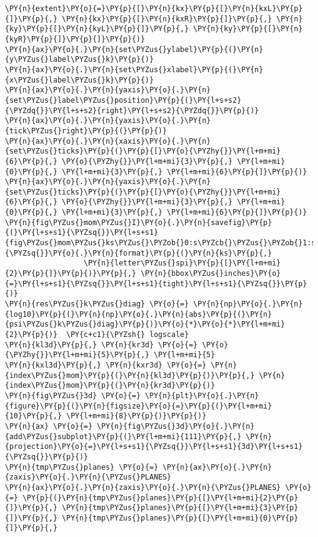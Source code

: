 \begin{Verbatim}[commandchars=\\\{\}]
          \PY{n}{extent}\PY{o}{=}\PY{p}{[}\PY{n}{kx}\PY{p}{[}\PY{n}{kxL}\PY{p}{]}\PY{p}{,} \PY{n}{kx}\PY{p}{[}\PY{n}{kxR}\PY{p}{]}\PY{p}{,} \PY{n}{ky}\PY{p}{[}\PY{n}{kyL}\PY{p}{]}\PY{p}{,} \PY{n}{ky}\PY{p}{[}\PY{n}{kyR}\PY{p}{]}\PY{p}{]}\PY{p}{)}
\PY{n}{ax}\PY{o}{.}\PY{n}{set\PYZus{}ylabel}\PY{p}{(}\PY{n}{y\PYZus{}label\PYZus{}k}\PY{p}{)}
\PY{n}{ax}\PY{o}{.}\PY{n}{set\PYZus{}xlabel}\PY{p}{(}\PY{n}{x\PYZus{}label\PYZus{}k}\PY{p}{)}
\PY{n}{ax}\PY{o}{.}\PY{n}{yaxis}\PY{o}{.}\PY{n}{set\PYZus{}label\PYZus{}position}\PY{p}{(}\PY{l+s+s2}{\PYZdq{}}\PY{l+s+s2}{right}\PY{l+s+s2}{\PYZdq{}}\PY{p}{)}
\PY{n}{ax}\PY{o}{.}\PY{n}{yaxis}\PY{o}{.}\PY{n}{tick\PYZus{}right}\PY{p}{(}\PY{p}{)}
\PY{n}{ax}\PY{o}{.}\PY{n}{xaxis}\PY{o}{.}\PY{n}{set\PYZus{}ticks}\PY{p}{(}\PY{p}{[}\PY{o}{\PYZhy{}}\PY{l+m+mi}{6}\PY{p}{,} \PY{o}{\PYZhy{}}\PY{l+m+mi}{3}\PY{p}{,} \PY{l+m+mi}{0}\PY{p}{,} \PY{l+m+mi}{3}\PY{p}{,} \PY{l+m+mi}{6}\PY{p}{]}\PY{p}{)}
\PY{n}{ax}\PY{o}{.}\PY{n}{yaxis}\PY{o}{.}\PY{n}{set\PYZus{}ticks}\PY{p}{(}\PY{p}{[}\PY{o}{\PYZhy{}}\PY{l+m+mi}{6}\PY{p}{,} \PY{o}{\PYZhy{}}\PY{l+m+mi}{3}\PY{p}{,} \PY{l+m+mi}{0}\PY{p}{,} \PY{l+m+mi}{3}\PY{p}{,} \PY{l+m+mi}{6}\PY{p}{]}\PY{p}{)}
\PY{n}{fig\PYZus{}mom\PYZus{}I}\PY{o}{.}\PY{n}{savefig}\PY{p}{(}\PY{l+s+s1}{\PYZsq{}}\PY{l+s+s1}{fig\PYZus{}mom\PYZus{}ks\PYZus{}\PYZob{}0:s\PYZcb{}\PYZus{}\PYZob{}1:s\PYZcb{}}\PY{l+s+s1}{\PYZsq{}}\PY{o}{.}\PY{n}{format}\PY{p}{(}\PY{n}{ks}\PY{p}{,}
                  \PY{n}{letter\PYZus{}spi}\PY{p}{[}\PY{l+m+mi}{2}\PY{p}{]}\PY{p}{)}\PY{p}{,} \PY{n}{bbox\PYZus{}inches}\PY{o}{=}\PY{l+s+s1}{\PYZsq{}}\PY{l+s+s1}{tight}\PY{l+s+s1}{\PYZsq{}}\PY{p}{)}
\PY{n}{res\PYZus{}k\PYZus{}diag} \PY{o}{=} \PY{n}{np}\PY{o}{.}\PY{n}{log10}\PY{p}{(}\PY{n}{np}\PY{o}{.}\PY{n}{abs}\PY{p}{(}\PY{n}{psi\PYZus{}k\PYZus{}diag}\PY{p}{)}\PY{o}{*}\PY{o}{*}\PY{l+m+mi}{2}\PY{p}{)}  \PY{c+c1}{\PYZsh{} logscale}
\PY{n}{kl3d}\PY{p}{,} \PY{n}{kr3d} \PY{o}{=} \PY{o}{\PYZhy{}}\PY{l+m+mi}{5}\PY{p}{,} \PY{l+m+mi}{5}
\PY{n}{kxl3d}\PY{p}{,} \PY{n}{kxr3d} \PY{o}{=} \PY{n}{index\PYZus{}mom}\PY{p}{(}\PY{n}{kl3d}\PY{p}{)}\PY{p}{,} \PY{n}{index\PYZus{}mom}\PY{p}{(}\PY{n}{kr3d}\PY{p}{)}
\PY{n}{fig\PYZus{}3d} \PY{o}{=} \PY{n}{plt}\PY{o}{.}\PY{n}{figure}\PY{p}{(}\PY{n}{figsize}\PY{o}{=}\PY{p}{(}\PY{l+m+mi}{10}\PY{p}{,} \PY{l+m+mi}{8}\PY{p}{)}\PY{p}{)}
\PY{n}{ax} \PY{o}{=} \PY{n}{fig\PYZus{}3d}\PY{o}{.}\PY{n}{add\PYZus{}subplot}\PY{p}{(}\PY{l+m+mi}{111}\PY{p}{,} \PY{n}{projection}\PY{o}{=}\PY{l+s+s1}{\PYZsq{}}\PY{l+s+s1}{3d}\PY{l+s+s1}{\PYZsq{}}\PY{p}{)}
\PY{n}{tmp\PYZus{}planes} \PY{o}{=} \PY{n}{ax}\PY{o}{.}\PY{n}{zaxis}\PY{o}{.}\PY{n}{\PYZus{}PLANES}
\PY{n}{ax}\PY{o}{.}\PY{n}{zaxis}\PY{o}{.}\PY{n}{\PYZus{}PLANES} \PY{o}{=} \PY{p}{(}\PY{n}{tmp\PYZus{}planes}\PY{p}{[}\PY{l+m+mi}{2}\PY{p}{]}\PY{p}{,} \PY{n}{tmp\PYZus{}planes}\PY{p}{[}\PY{l+m+mi}{3}\PY{p}{]}\PY{p}{,} \PY{n}{tmp\PYZus{}planes}\PY{p}{[}\PY{l+m+mi}{0}\PY{p}{]}\PY{p}{,}

\end{Verbatim}
